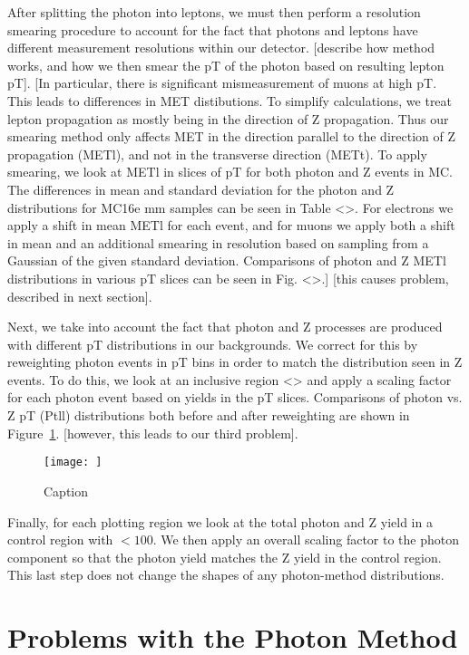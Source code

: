 After splitting the photon into leptons, we must then perform a resolution smearing procedure to account for the fact that photons and leptons have different measurement resolutions within our detector. [describe how method works, and how we then smear the pT of the photon based on resulting lepton pT]. [In particular, there is significant mismeasurement of muons at high pT. This leads to differences in MET distibutions. To simplify calculations, we treat lepton propagation as mostly being in the direction of Z propagation. Thus our smearing method only affects MET in the direction parallel to the direction of Z propagation (METl), and not in the transverse direction (METt). To apply smearing, we look at METl in slices of pT for both photon and Z events in MC. The differences in mean and standard deviation for the photon and Z distributions for MC16e mm samples can be seen in Table <>. For electrons we apply a shift in mean METl for each event, and for muons we apply both a shift in mean and an additional smearing in resolution based on sampling from a Gaussian of the given standard deviation. Comparisons of photon and Z METl distributions in various pT slices can be seen in Fig. <>.] [this causes problem, described in next section].

Next, we take into account the fact that photon and Z processes are produced with different pT distributions in our backgrounds. We correct for this by reweighting photon events in pT bins in order to match the distribution seen in Z events. To do this, we look at an inclusive region <> and apply a scaling factor for each photon event based on yields in the pT slices. Comparisons of photon vs. Z pT (Ptll) distributions both before and after reweighting are shown in Figure~\ref{fig:reweighting}. [however, this leads to our third problem].

\begin{figure}
    \centering
    \texttt{[image: ]}
    \caption{Caption}
    \label{fig:reweighting}
\end{figure}

Finally, for each plotting region we look at the total photon and Z yield in a control region with \MET$<100$. We then apply an overall scaling factor to the photon component so that the photon yield matches the Z yield in the control region. This last step does not change the shapes of any photon-method distributions.

\section{Problems with the Photon Method}

